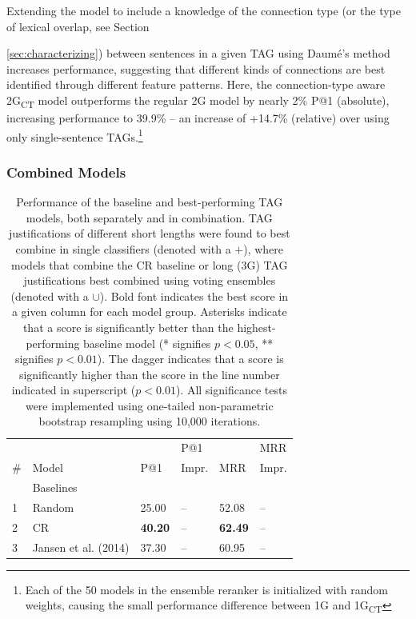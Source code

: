 Extending the model to include a knowledge of the connection type (or the type of lexical overlap, see Section~{\ref{sec:characterizing}) between sentences in a given TAG using Daum{\'e}'s method~\cite{daume2007} increases performance, suggesting that different kinds of connections are best identified through different feature patterns.  Here, the connection-type aware 2G\textsubscript{CT} model outperforms the regular 2G model by nearly 2\% P@1 (absolute), increasing performance to 39.9\% -- an increase of +14.7\% (relative) over using only single-sentence TAGs.\footnote{Each of the 50 models in the ensemble reranker is initialized with random weights, causing the small performance difference between 1G and 1G\textsubscript{CT}}





\subsubsection{Combined Models}
\label{sec:combinedmodels}
%
%
\begin{table}[t]
    \small
    \caption{{
Performance of the baseline and best-performing TAG models, both separately and in combination. TAG justifications of different short lengths were found to best combine in single classifiers (denoted with a $+$), where models that combine the CR baseline or long (3G) TAG justifications best combined using voting ensembles (denoted with a $\cup$). Bold font indicates the best score in a given column for each model group. Asterisks indicate that a score is significantly better than the highest-performing baseline model (* signifies $p < 0.05$, ** signifies $p < 0.01$).  The dagger indicates that a score is significantly higher than the score in the line number indicated in superscript ($p < 0.01$). All significance tests were implemented using one-tailed non-parametric bootstrap resampling using 10,000 iterations. }}
\begin{center}
\begin{tabular}{p{0.3mm}p{55mm}llll}
\multicolumn{1}{l}{ } & \multicolumn{1}{l}{ } & \multicolumn{1}{l}{ } & \multicolumn{1}{l}{P@1} & \multicolumn{1}{l}{ } & \multicolumn{1}{l}{MRR} \\
\multicolumn{1}{l}{\#} & \multicolumn{1}{l}{ Model } & \multicolumn{1}{l}{P@1} & \multicolumn{1}{l}{Impr.} & \multicolumn{1}{l}{MRR} & \multicolumn{1}{l}{Impr.} \\

\hline
& \multicolumn{5}{l}{Baselines }\\
\hline
1 & Random					& 25.00 			& --		& 52.08  		& --	  \\
2 & CR 						& {\bf 40.20} 	& -- 	& {\bf 62.49}	&	--  \\
3 & Jansen et al. (2014)		& 37.30 			& --		& 60.95 			& 	--	 \\


\end{tabular}
\end{center}
\end{table}}
